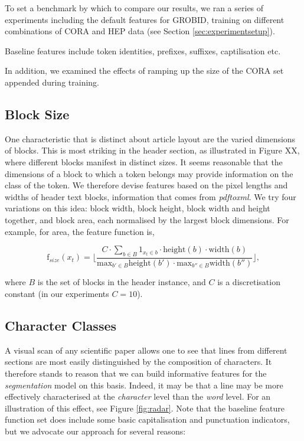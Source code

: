 To set a benchmark by which to compare our results, we ran a series of experiments including the default features for GROBID, training on different combinations of CORA and HEP data (see Section \ref{sec:experimentsetup}).

Baseline features include token identities, prefixes, suffixes, captilisation etc.

In addition, we examined the effects of ramping up the size of the CORA set appended during training.

\subsection{Block Size}

One characteristic that is distinct about article layout are the varied dimensions of blocks. This is most striking in the header section, as illustrated in Figure XX, where different blocks manifest in distinct sizes. It seems reasonable that the dimensions of a block to which a token belongs may provide information on the class of the token. We therefore devise features based on the pixel lengths and widths of header text blocks, information that comes from \emph{pdftoxml}. We try four variations on this idea: block width, block height, block width and height together, and block area, each normalised by the largest block dimensions. For example, for area, the feature function is,

\begin{equation}
\text{f}_{size}(x_t) =  \Bigg\lfloor\frac{C \cdot \sum_{b \in B} 1_{x_t \in b} \cdot\text{height}(b)\cdot\text{width}(b)}{\text{max}_{b' \in B} \text{height}(b') \cdot \text{max}_{b'' \in B} \text{width}(b'')} \Bigg\rfloor,
\label{eq:areafunction}
\end{equation}

where $B$ is the set of blocks in the header instance, and $C$ is a discretisation constant (in our experiments $C = 10$).

\subsection{Character Classes}

A visual scan of any scientific paper allows one to see that lines from different sections are most easily distinguished by the composition of characters. It therefore stands to reason that we can build informative features for the \emph{segmentation} model on this basis. Indeed, it may be that a line may be more effectively characterised at the \emph{character} level than the \emph{word} level. For an illustration of this effect, see Figure \ref{fig:radar}. Note that the baseline feature function set does include some basic capitalisation and punctuation indicators, but we advocate our approach for several reasons:

